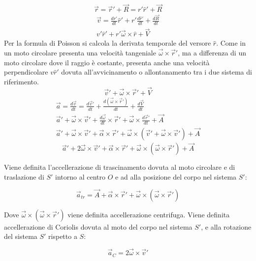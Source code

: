 \documentclass{article}
\numberwithin{equation}{subsection}
\begin{document}
\begin{equation}
    \vec{r}=\vec{r}'+\vec{R}=r'\hat{r}'+\vec{R}
\end{equation}
\begin{gather*}
    \vec{v}=\displaystyle\frac{dr'}{dt}\hat{r}'+r'\frac{d\hat{r}'}{dt}+\frac{d\vec{R}}{dt}\\
    v'\hat{r}'+r'\vec{\omega}\times\hat{r}+\vec{V}
\end{gather*}
Per la formula di Poisson si calcola la derivata temporale del versore $\hat{r}$. 
Come in un moto circolare presenta una velocità tangeniale $\vec{\omega}\times\vec{r}'$, ma a differenza di un moto circolare dove il raggio è costante, presenta anche una 
velocità perpendicolare $v\hat{r}'$ dovuta all'avvicinamento o allontanamento tra i due sistema di riferimento. 
\begin{equation}
    \vec{v}'+\vec{\omega}\times\vec{r}'+\vec{V}
\end{equation}
\begin{gather*}
    \vec{a}=\displaystyle\frac{d\vec{v}}{dt}=\frac{d\vec{v}'}{dt}+\frac{d(\vec{\omega}\times\vec{r}')}{dt}+\frac{d\vec{V}}{dt}\\
    \vec{a}'+\vec{\omega}\times\vec{v}'+\displaystyle\frac{d\vec{\omega}}{dt}\times\vec{r}'+\vec{\omega}\times\frac{d\vec{r}'}{dt}+\vec{A}\\
    \vec{a}'+\vec{\omega}\times\vec{v}'+\vec{\alpha}\times\vec{r}'+\vec{\omega}\times(\vec{v}'+\vec{\omega}\times\vec{v}')+\vec{A}
\end{gather*}
\begin{equation}
    \vec{a}'+2\vec{\omega}\times\vec{v}'+\vec{\alpha}\times\vec{r}'+\vec{\omega}\times(\vec{\omega}\times\vec{r}')+\vec{A}
\end{equation}

Viene definita l'accellerazione di trascinamento dovuta al moto 
circolare e di traslazione di $S'$ intorno al centro $O$ e ad alla posizione del corpo nel sistema $S'$: 

\begin{equation}
    \vec{a}_{tr}=\vec{A}+\vec{\alpha}\times\vec{r}'+\vec{\omega}\times(\vec{\omega}\times\vec{r}')
\end{equation}

Dove $\vec{\omega}\times(\vec{\omega}\times\vec{r}')$ viene 
definita accellerazione centrifuga.
Viene definita accellerazione di Coriolis dovuta al moto del 
corpo nel sistema $S'$, e alla rotazione del sistema $S'$ rispetto a $S$:

\begin{equation}
    \vec{a}_C=2\vec{\omega}\times\vec{v}'
\end{equation}
\end{document}
